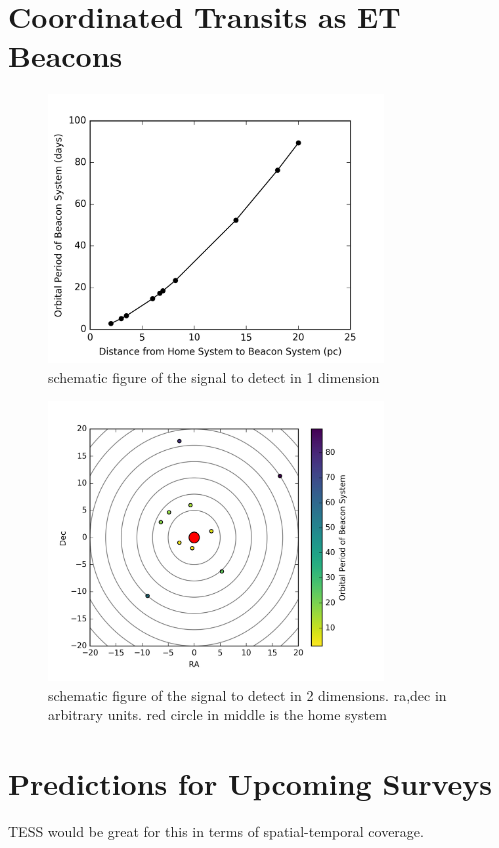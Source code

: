 \documentclass[]{openjournal}
\begin{document}
\section{Coordinated Transits as ET Beacons}



\begin{figure}[]
\centering
\includegraphics[width=3.5in]{../figures/dist_per.png}
\caption{schematic figure of the signal to detect in 1 dimension}
\label{fig:1d}
\end{figure}


\begin{figure}[]
\centering
\includegraphics[width=3.5in]{../figures/sky_per.png}
\caption{schematic figure of the signal to detect in 2 dimensions. ra,dec in arbitrary units. red circle in middle is the home system}
\label{fig:2d}
\end{figure}


\section{Predictions for Upcoming Surveys}
TESS would be great for this in terms of spatial-temporal coverage. 
\end{document}
